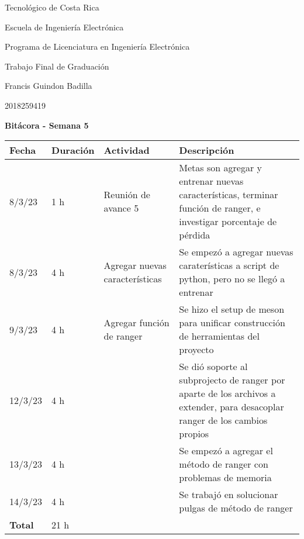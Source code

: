 \documentclass[12pt,oneside]{book}
\begin{document}
 \graphicspath{{./}{../tesis/fig/}}
  Tecnológico de Costa Rica
  \par\vspace{1mm}
  Escuela de Ingeniería Electrónica
  \par\vspace{1mm}
  Programa de Licenciatura en Ingeniería Electrónica
  \par\vspace{10mm}
  Trabajo Final de Graduación
  \par\vspace{1mm}
  Francis Guindon Badilla
  \par\vspace{1mm}
  2018259419
  \par\vspace{10mm}
  \large\textbf{Bitácora - Semana 5}
  \par\vspace{10mm}
  \small

  \begin{table} [!h]
    \centering
    \small
    \begin{tabular}{p{1.5 cm} p{2.1 cm} p{5 cm} p{8 cm}}
      \hline
      Fecha & Duración & Actividad & Descripción \\
      \hline
      8/3/23 & 1 h & Reunión de avance 5 & Metas son agregar y entrenar nuevas características, terminar función de ranger, e investigar porcentaje de pérdida \\
      8/3/23 & 4 h & Agregar nuevas características & Se empezó a agregar nuevas caraterísticas a script de python, pero no se llegó a entrenar \\
      9/3/23 & 4 h & Agregar función de ranger & Se hizo el setup de meson para unificar construcción de herramientas del proyecto \\
      12/3/23 & 4 h & & Se dió soporte al subprojecto de ranger por aparte de los archivos a extender, para desacoplar ranger de los cambios propios \\
      13/3/23 & 4 h & & Se empezó a agregar el método de ranger con problemas de memoria \\
      14/3/23 & 4 h & & Se trabajó en solucionar pulgas de método de ranger \\
      \hline
      \textbf{Total} & 21 h \\
      \hline
    \end{tabular}
  \end{table}
  
  \vfill
\end{document}
